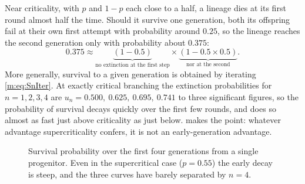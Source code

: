 Near criticality, with $p$ and $1-p$ each close to a half, a lineage dies at its
first round almost half the time. Should it survive one generation, both its
offspring fail at their own first attempt with probability around $0.25$, so the
lineage reaches the second generation only with probability about $0.375$:
\begin{equation*}
0.375\approx
\underbrace{(1-0.5)}_{\text{no extinction at the first step}}\times
\underbrace{(1-0.5\times0.5)}_{\text{nor at the second}} .
\end{equation*}
More generally, survival to a given generation is obtained by iterating
\cref{m:eq:SnIter}. At exactly critical branching the extinction probabilities for
$n=1,2,3,4$ are $u_n = 0.500,\ 0.625,\ 0.695,\ 0.741$ to three significant figures,
so the probability of survival decays quickly over the first few rounds, and does
so almost as fast just above criticality as just below.  makes
the point: whatever advantage supercriticality confers, it is not an
early-generation advantage.

\begin{figure}[ht]
\centering
\caption{Survival probability over the first four generations from a single
progenitor. Even in the supercritical case ($p=0.55$) the early decay is steep, and
the three curves have barely separated by $n=4$.}
\label{m:fig:earlySn}
\end{figure}


